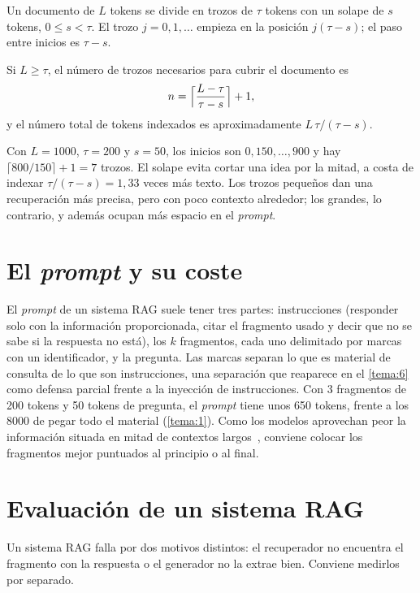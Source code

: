 \begin{definicion}\label{def:troceo}
Un documento de $L$ tokens se divide en trozos de $\tau$ tokens con un solape de $s$ tokens, $0\le s<\tau$. El trozo $j=0,1,\dots$ empieza en la posición $j(\tau-s)$; el paso entre inicios es $\tau-s$.
\end{definicion}

\begin{proposicion}\label{prop:troceo}
Si $L\ge\tau$, el número de trozos necesarios para cubrir el documento es
\[
n=\Bigl\lceil\frac{L-\tau}{\tau-s}\Bigr\rceil+1,
\]
y el número total de tokens indexados es aproximadamente $L\,\tau/(\tau-s)$.
\end{proposicion}

Con $L=1000$, $\tau=200$ y $s=50$, los inicios son $0,150,\dots,900$ y hay $\lceil 800/150\rceil+1=7$ trozos. El solape evita cortar una idea por la mitad, a costa de indexar $\tau/(\tau-s)=1{,}33$ veces más texto. Los trozos pequeños dan una recuperación más precisa, pero con poco contexto alrededor; los grandes, lo contrario, y además ocupan más espacio en el \emph{prompt}.

\section{El \emph{prompt} y su coste}

El \emph{prompt} de un sistema RAG suele tener tres partes: instrucciones (responder solo con la información proporcionada, citar el fragmento usado y decir que no se sabe si la respuesta no está), los $k$ fragmentos, cada uno delimitado por marcas con un identificador, y la pregunta. Las marcas separan lo que es material de consulta de lo que son instrucciones, una separación que reaparece en el \cref{tema:6} como defensa parcial frente a la inyección de instrucciones. Con 3 fragmentos de 200 tokens y 50 tokens de pregunta, el \emph{prompt} tiene unos 650 tokens, frente a los 8000 de pegar todo el material (\cref{tema:1}). Como los modelos aprovechan peor la información situada en mitad de contextos largos~\cite{liu-lost}, conviene colocar los fragmentos mejor puntuados al principio o al final.

\section{Evaluación de un sistema RAG}

Un sistema RAG falla por dos motivos distintos: el recuperador no encuentra el fragmento con la respuesta o el generador no la extrae bien. Conviene medirlos por separado.


